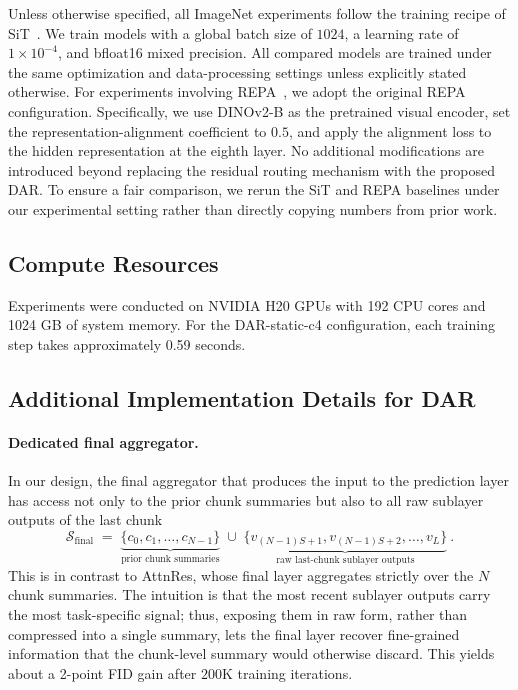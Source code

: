 \documentclass{llmxive}
\begin{document}
Unless otherwise specified, all ImageNet experiments follow the training recipe of SiT~\citep{ma2024sit}. We train models with a global batch size of $1024$, a learning rate of $1 \times 10^{-4}$, and bfloat16 mixed precision. All compared models are trained under the same optimization and data-processing settings unless explicitly stated otherwise. For experiments involving REPA~\citep{yu2025repa}, we adopt the original REPA configuration. Specifically, we use DINOv2-B as the pretrained visual encoder, set the representation-alignment coefficient to $0.5$, and apply the alignment loss to the hidden representation at the eighth layer. No additional modifications are introduced beyond replacing the residual routing mechanism with
the proposed \textsc{DAR}. To ensure a fair comparison, we rerun the SiT and REPA baselines under our experimental setting rather than directly copying numbers from prior work.

\subsection{Compute Resources}
Experiments were conducted on NVIDIA H20 GPUs with 192 CPU cores and 1024 GB of system memory. For the DAR-static-c4 configuration, each training step takes approximately 0.59 seconds.

\subsection{Additional Implementation Details for DAR}

\paragraph{Dedicated final aggregator.} In our design, the final aggregator that produces the input to the prediction layer has access not only to the prior chunk summaries but also to all raw sublayer outputs of the last chunk        
\begin{equation}
\mathcal{S}_{\text{final}} \;=\; \underbrace{\{c_0, c_1, \ldots, c_{N-1}\}}_{\text{prior chunk summaries}} \;\cup\;               
\underbrace{\{v_{(N-1)S+1}, v_{(N-1)S+2}, \ldots, v_L\}}_{\text{raw last-chunk sublayer outputs}} \ .                                    
\end{equation}
This is in contrast to AttnRes, whose final layer aggregates strictly over the $N$ chunk summaries. The intuition is that the most recent sublayer outputs carry the most task-specific signal; thus, exposing them in raw form, rather than compressed into a single summary, lets the final layer recover fine-grained information that the chunk-level summary would otherwise discard. This yields about a 2-point FID gain after $200\text{K}$ training iterations.
\end{document}
